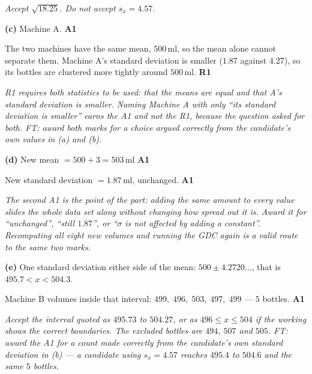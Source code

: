 \documentclass[12pt, twoside]{article}
\begin{document}
\begin{enumerate}[itemsep=0.3cm]
\emph{Accept $\sqrt{18.25}$. Do not accept $s_{x} = 4.57$.}

\textbf{(c)} Machine A. \hfill \textbf{A1}

The two machines have the same mean, $500$\,ml, so the mean alone cannot
separate them. Machine A's standard deviation is smaller ($1.87$ against
$4.27$), so its bottles are clustered more tightly around $500$\,ml.
\hfill \textbf{R1}

\emph{R1 requires both statistics to be used: that the means are equal
\emph{and} that A's standard deviation is smaller. Naming Machine A with only
``its standard deviation is smaller'' earns the A1 and not the R1, because
the question asked for both. FT: award both marks for a choice argued
correctly from the candidate's own values in (a) and (b).}

\textbf{(d)} New mean $= 500 + 3 = 503$\,ml \hfill \textbf{A1}

New standard deviation $= 1.87$\,ml, unchanged. \hfill \textbf{A1}

\emph{The second A1 is the point of the part: adding the same amount to every
value slides the whole data set along without changing how spread out it is.
Award it for ``unchanged'', ``still $1.87$'', or ``$\sigma$ is not affected by
adding a constant''. Recomputing all eight new volumes and running the GDC
again is a valid route to the same two marks.}

\textbf{(e)} One standard deviation either side of the mean:
$500 \pm 4.2720\ldots$, \quad that is $495.7 < x < 504.3$.

Machine B volumes inside that interval: $499,\; 496,\; 503,\; 497,\; 499$
--- \quad $5$ bottles. \hfill \textbf{A1}

\emph{Accept the interval quoted as $495.73$ to $504.27$, or as
$496 \leq x \leq 504$ if the working shows the correct boundaries. The
excluded bottles are $494$, $507$ and $505$. FT: award the A1 for a count
made correctly from the candidate's own standard deviation in (b) --- a
candidate using $s_{x} = 4.57$ reaches $495.4$ to $504.6$ and the same
$5$ bottles.}

\end{enumerate}
\end{document}
